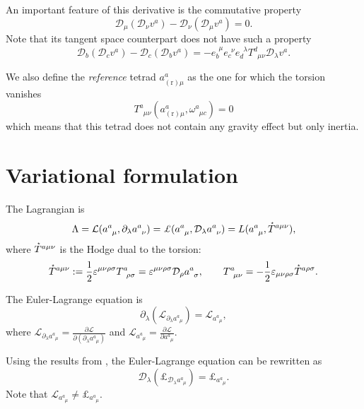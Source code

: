 \documentclass[
10pt, %
a4paper, %
oneside, %
headinclude,footinclude, %
BCOR5mm, %
]{scrartcl}
\newcommand{\pd}{\partial}
\newcommand{\itetr}[2]{e^{\phantom{#2}#1}_{#2}}
\newcommand{\tetr}[2]{a^{#1}_{\phantom{#1}#2}}
\newcommand{\rtetr}[2]{a^{#1}_{(\text{r}) #2}}
\newcommand{\spin}[2]{\omega^{#1}_{\phantom{#1}#2}}
\newcommand{\D}[1]{\mathcal{D}_{#1}} %
\newcommand{\Tors}[2]{T^{#1}_{\phantom{a}#2}}
\newcommand{\Lag}{\mathcal{L}}	%
\newcommand{\Lagcov}{\pounds}%
\newcommand{\Laghodge}{L}%
\newcommand{\veps}{\varepsilon}
\newcommand{\HT}[1]{\accentset{\star}{T}^{#1}}
\begin{document}
An important feature of this derivative is the commutative property
\begin{equation}\label{eqn.commut.D}
\D{\mu}(\D{\nu} v^a) - \D{\nu}(\D{\mu} v^a) = 0.
\end{equation}
Note that its tangent space counterpart does not have such a property
\begin{equation}
\D{b}(\D{c} v^a) - \D{c}(\D{b} v^a) = 
-\itetr{\mu}{b}\itetr{\nu}{c}\itetr{\lambda}{d}\Tors{d}{\mu\nu}\D{\lambda}v^a .
\end{equation}

We also define the \textit{reference} tetrad $ \rtetr{a}{\mu} $ as the one for which the torsion 
vanishes
\begin{equation}
\Tors{a}{\mu\nu}(\rtetr{a}{\mu},\spin{a}{\mu c}) = 0
\end{equation}
which means that this tetrad does not contain any gravity effect but only inertia.

\section{Variational formulation}
The Lagrangian is 
\begin{equation}
\Lambda = \Lag(\tetr{a}{\mu},\pd_\lambda\tetr{a}{\nu}) = 
\Lagcov(\tetr{a}{\mu},\D{\lambda}\tetr{a}{\nu})  = \Laghodge(\tetr{a}{\mu},\HT{a\mu\nu}),
\end{equation}
where $ \HT{a\mu\nu} $ is the Hodge dual to the torsion:
\begin{equation}\label{eqn.Hodge.def}
\HT{a\mu\nu} := \frac{1}{2}\veps^{\mu\nu\rho\sigma}\Tors{a}{\rho\sigma} = 
\veps^{\mu\nu\rho\sigma}\D{\rho}\tetr{a}{\sigma}, \qquad \Tors{a}{\mu\nu} = 
-\frac{1}{2}\veps_{\mu\nu\rho\sigma}\HT{a\rho\sigma}.
\end{equation}




The Euler-Lagrange equation is
\begin{equation}
\pd_\lambda(\Lag_{\pd_\lambda\tetr{a}{\mu}}) = \Lag_{\tetr{a}{\mu}},
\end{equation}
where $ \Lag_{\pd_\lambda\tetr{a}{\mu}} = \frac{\pd \Lag}{\pd(\pd_\lambda\tetr{a}{\mu})} $ and $ 
\Lag_{\tetr{a}{\mu}} = \frac{\pd \Lag}{\pd \tetr{a}{\mu}} $.


Using the results from \cite{Lewis2009,Lorce2013}, the Euler-Lagrange equation can be rewritten as
\begin{equation}\label{eqn.cov.field.PDE}
\D{\lambda}(\Lagcov_{\D{\lambda}\tetr{a}{\mu}}) = \Lagcov_{\tetr{a}{\mu}}.
\end{equation}
Note that $  \Lag_{\tetr{a}{\mu}} \neq  \Lagcov_{\tetr{a}{\mu}}. $
\end{document}
